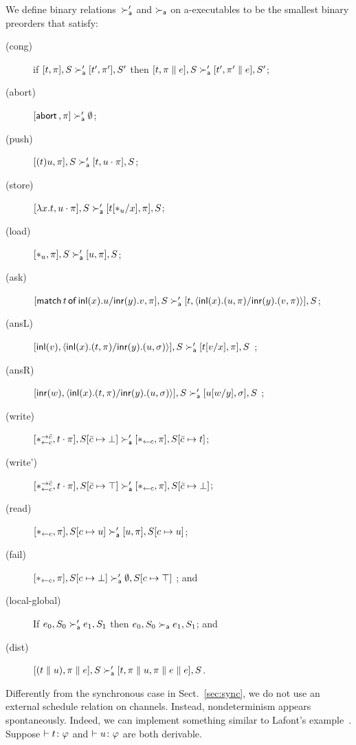 We define binary relations~$\succ_{\mathsf a}'$ and $\succ_{\mathsf a}$ on a-executables to be the smallest binary preorders
that satisfy:
\begin{description}
 \item[(cong)] if
	    $[t,\pi],         S \succ_{\mathsf a}' [ t',\pi'],        S'$
	    then
	    $[t,\pi \parallel e], S \succ_{\mathsf a}' [ t',\pi'\parallel e], S'$\enspace;
 \item[(abort)] $[\mathsf{abort\,},\pi] \succ_{\mathsf a}' \emptyset$\enspace;
 \item[(push)]
	    $[(t)u,\pi],S       \succ_{\mathsf a}' [t,u\cdot\pi],S$;
 \item[(store)]
	    $[\lambda x.t,u\cdot\pi],S
	     \succ_{\mathsf a}'
	     [t[\ast_u/x],      \pi],S$\enspace;
 \item[(load)]
	    $[\ast_u,\pi],S\succ_{\mathsf a}'[u,\pi],S$\enspace;
 \item[(ask)]
      $[\mathsf{match}\,{t}\,\mathsf{of}\, \mathsf{inl}({x}). {u}/ \mathsf{inr}({y}). {v},\pi], S\succ_{\mathsf a}' [t,\langle \mathsf{inl}({x}). ({u},{\pi})/ \mathsf{inr}({y}). ({v},{\pi})\rangle], S$\enspace;
 \item[(ansL)]
      $[\mathsf{inl}({v}), \langle \mathsf{inl}({x}). ({t},{\pi})/ \mathsf{inr}({y}). ({u},{\sigma})\rangle],S \succ_{\mathsf a}' [t[v/x],\pi],S $ \enspace;
 \item[(ansR)]
      $[\mathsf{inr}({w}), \langle \mathsf{inl}({x}). ({t},{\pi})/ \mathsf{inr}({y}). ({u},{\sigma})\rangle],S \succ_{\mathsf a}' [u[w/y],\sigma],S $ \enspace;
 \item[(write)]
	    $
	    [\ast^{\rightarrow {\bar{c}}}_{\leftarrow{c}}, t\cdot\pi], S[\bar{c}\mapsto\bot]
	    \succ_{\mathsf a}'
	    [\ast_{\leftarrow{c}}, \pi],
	    S[\bar{c}\mapsto t]
	    $\enspace;
 \item[(write')]
	    $
	    [\ast^{\rightarrow {\bar{c}}}_{\leftarrow{c}}, t\cdot\pi], S[\bar{c}\mapsto \top]
	    \succ_{\mathsf a}'
	    [\ast_{\leftarrow{c}}, \pi],
	    S[\bar{c}\mapsto \bot]
	    $\enspace;
 \item[(read)]$
	    [\ast_{\leftarrow{c}} ,\pi],
	    S[c\mapsto u]
	    \succ_{\mathsf a}'
	    [u,\pi],
	    S[c\mapsto u]
	    $\enspace;
 \item[(fail)]
	    $
	    [\ast_{\leftarrow{c}},\pi],
	    S[c\mapsto \bot]
	    \succ_{\mathsf a}'
	    \emptyset,S[c\mapsto \top]
	    $
	    \enspace; and
 \item[(local-global)] If $e_0, S_0\succ_{\mathsf a}'e_1, S_1$ then $e_0, S_0\succ_{\mathsf a} e_1,
      S_1$\enspace; and
 \item[(dist)]
	    $[(t\parallel u),\pi\parallel e],S   \succ_{\mathsf a}' [t,\pi\parallel u,\pi\parallel
      e\parallel e],S$\enspace.
\end{description}
Differently from the synchronous case in Sect.~\ref{sec:sync},
we do not use an external schedule relation on channels.
Instead, nondeterminism appears spontaneously.
Indeed, we can implement something similar to Lafont's
example~\citep[B.1]{girard1989proofs}.
Suppose $\vdash{t} \colon{\varphi}$ and $\vdash{u} \colon{\varphi}$ are both derivable.
